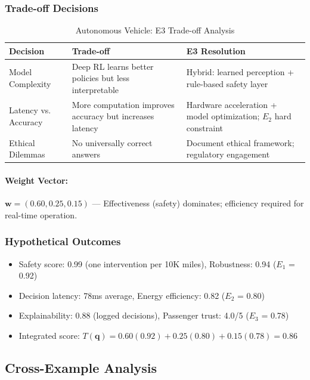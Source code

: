 \subsubsection{Trade-off Decisions}

\begin{table}[h]
\centering
\caption{Autonomous Vehicle: E3 Trade-off Analysis}
\label{tab:av_tradeoff}
\small
\begin{tabularx}{\columnwidth}{@{}l X X@{}}
\toprule
\textbf{Decision} & \textbf{Trade-off} & \textbf{E3 Resolution} \\
\midrule
Model Complexity & Deep RL learns better policies but less interpretable & Hybrid: learned perception + rule-based safety layer \\
Latency vs. Accuracy & More computation improves accuracy but increases latency & Hardware acceleration + model optimization; $E_2$ hard constraint \\
Ethical Dilemmas & No universally correct answers & Document ethical framework; regulatory engagement \\
\bottomrule
\end{tabularx}
\end{table}

\paragraph{Weight Vector:} $\mathbf{w} = (0.60, 0.25, 0.15)$ — Effectiveness (safety) dominates; efficiency required for real-time operation.

\subsubsection{Hypothetical Outcomes}

\begin{itemize}[leftmargin=2em]
    \item Safety score: 0.99 (one intervention per 10K miles), Robustness: 0.94 ($E_1$ = 0.92)
    \item Decision latency: 78ms average, Energy efficiency: 0.82 ($E_2$ = 0.80)
    \item Explainability: 0.88 (logged decisions), Passenger trust: 4.0/5 ($E_3$ = 0.78)
    \item Integrated score: $T(\mathbf{q}) = 0.60(0.92) + 0.25(0.80) + 0.15(0.78) = 0.86$
\end{itemize}

\subsection{Cross-Example Analysis}


